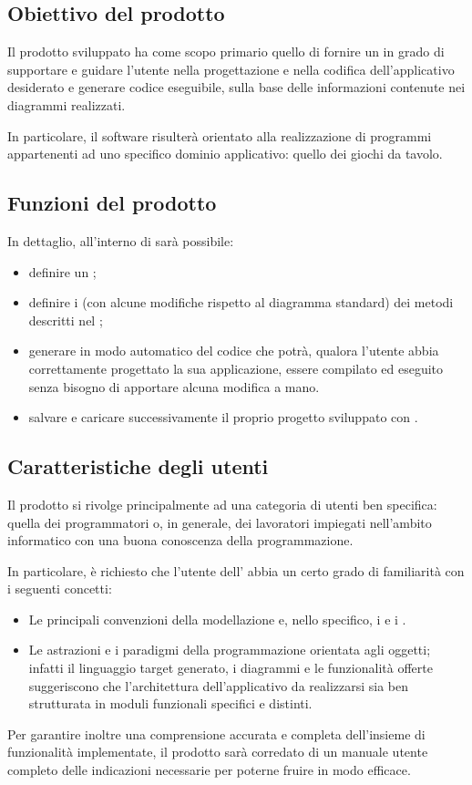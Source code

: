 \subsection{Obiettivo del prodotto}
Il prodotto sviluppato ha come scopo primario quello di fornire un  in grado di supportare e guidare l'utente nella progettazione e nella codifica dell'applicativo desiderato e generare codice eseguibile, sulla base delle informazioni contenute nei diagrammi realizzati.

In particolare, il software risulterà orientato alla realizzazione di programmi appartenenti ad uno specifico dominio applicativo: quello dei giochi da tavolo.

\subsection{Funzioni del prodotto}
In dettaglio, all'interno di \proj{} sarà possibile:
\begin{itemize}
	\item definire un ;
	\item definire i  (con alcune modifiche rispetto al diagramma standard) dei metodi descritti nel ;
	\item generare in modo automatico del codice che potrà, qualora l'utente abbia correttamente progettato la sua applicazione, essere compilato ed eseguito senza bisogno di apportare alcuna modifica a mano.
	\item salvare e caricare successivamente il proprio progetto sviluppato con \proj.
\end{itemize}

\subsection{Caratteristiche degli utenti}
Il prodotto \proj{} si rivolge principalmente ad una categoria di utenti ben specifica: quella dei programmatori o, in generale, dei lavoratori impiegati nell'ambito informatico con una buona conoscenza della programmazione.

In particolare, è richiesto che l'utente dell' abbia un certo grado di familiarità con i seguenti concetti:
\begin{itemize}
	\item Le principali convenzioni della modellazione  e, nello specifico, i  e i .
	\item Le astrazioni e i paradigmi della programmazione orientata agli oggetti; infatti il linguaggio target generato, i diagrammi e le funzionalità offerte suggeriscono che l'architettura dell'applicativo da realizzarsi sia ben strutturata in moduli funzionali specifici e distinti.
\end{itemize}
Per garantire inoltre una comprensione accurata e completa dell'insieme di funzionalità implementate, il prodotto sarà corredato di un manuale utente completo delle indicazioni necessarie per poterne fruire in modo efficace.

